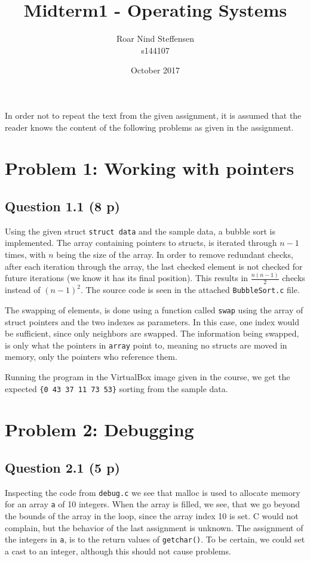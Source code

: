 \documentclass{article}
\title{Midterm1 - Operating Systems}
\author{Roar Nind Steffensen\\s144107}
\date{October 2017}
\begin{document}
\maketitle

In order not to repeat the text from the given assignment, it is assumed that the reader knows the content of the following problems as given in the assignment\cite{assignment}.
\section{Problem 1: Working with pointers}
\subsection{Question 1.1 (8 p)}

Using the given struct \texttt{struct data} and the sample data, a bubble sort is implemented. The array containing pointers to structs, is iterated through $n-1$ times, with $n$ being the size of the array. In order to remove redundant checks, after each iteration through the array, the last checked element is not checked for future iterations (we know it has its final position). This results in $\frac{n(n-1)}{2}$ checks instead of $(n-1)^2$. The source code is seen in the attached \texttt{BubbleSort.c} file.

The swapping of elements, is done using a function called \texttt{swap} using the array of struct pointers and the two indexes as parameters. In this case, one index would be sufficient, since only neighbors are swapped. The information being swapped, is only what the pointers in \texttt{array} point to, meaning no structs are moved in memory, only the pointers who reference them.

Running the program in the VirtualBox image given in the course, we get the expected \texttt{\{0 43 37 11 73 53\}} sorting from the sample data.

\section{Problem 2: Debugging}
\subsection{Question 2.1 (5 p)}

Inspecting the code from \texttt{debug.c} we see that malloc is used to allocate memory for an array \texttt{a} of 10 integers. When the array is filled, we see, that we go beyond the bounds of the array in the loop, since the array index 10 is set. C would not complain, but the behavior of the last assignment is unknown. The assignment of the integers in \texttt{a}, is to the return values of \texttt{getchar()}. To be certain, we could set a cast to an integer, although this should not cause problems. 
\end{document}
